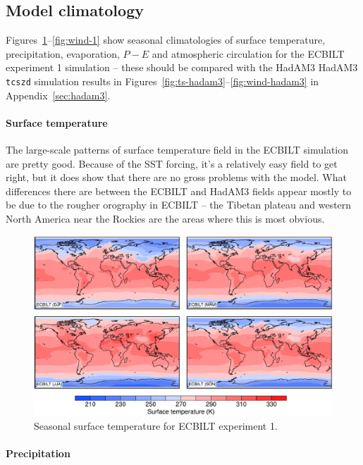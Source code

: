 \documentclass[a4paper,11pt,article]{article}
\begin{document}
\subsection{Model climatology}

Figures~\ref{fig:ts-1}--\ref{fig:wind-1} show seasonal climatologies
of surface temperature, precipitation, evaporation, $P-E$ and
atmospheric circulation for the ECBILT experiment 1 simulation --
these should be compared with the HadAM3 HadAM3 \texttt{tcszd}
simulation results in
Figures~\ref{fig:ts-hadam3}--\ref{fig:wind-hadam3} in
Appendix~\ref{sec:hadam3}.

\paragraph{Surface temperature}

The large-scale patterns of surface temperature field in the ECBILT
simulation are pretty good.  Because of the SST forcing, it's a
relatively easy field to get right, but it does show that there are no
gross problems with the model.  What differences there are between the
ECBILT and HadAM3 fields appear mostly to be due to the rougher
orography in ECBILT -- the Tibetan plateau and western North America
near the Rockies are the areas where this is most obvious.

\begin{figure}
  \begin{center}
    \includegraphics[width=\textwidth]{../expt-1/plots/ts-plots}
  \end{center}
  \caption{Seasonal surface temperature for ECBILT experiment 1.}
  \label{fig:ts-1}
\end{figure}

\paragraph{Precipitation}
\end{document}
